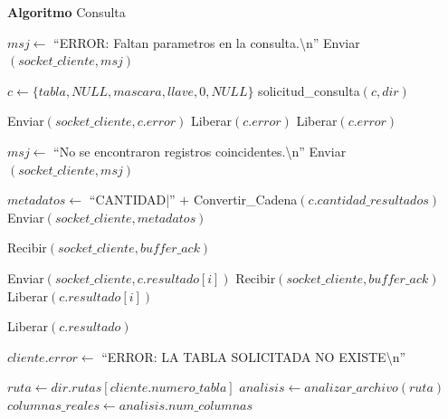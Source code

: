 \begin{tcolorbox}[colback=white, colframe=azul_unam, 
title=Pseudocódigo: consulta.c, breakable]

\textbf{Algoritmo} Consulta

\begin{algorithmic}[1]



    \State $msj \gets$ ``ERROR: Faltan parametros en la consulta.\textbackslash n''
    \State Enviar$(socket\_cliente, msj)$
    \State \Return
\EndIf

\State $c \gets \{tabla, NULL, mascara, llave, 0, NULL\}$
\State solicitud\_consulta$(c, dir)$

        \State Enviar$(socket\_cliente, c.error)$
        \State Liberar$(c.error)$
        \State \Return
    \EndIf
    \State Liberar$(c.error)$
\EndIf

    \State $msj \gets$ ``No se encontraron registros coincidentes.\textbackslash n''
    \State Enviar$(socket\_cliente, msj)$
    \State \Return
\EndIf

\State $metadatos \gets$ ``CANTIDAD|'' $+$ Convertir\_Cadena$(c.cantidad\_resultados)$
\State Enviar$(socket\_cliente, metadatos)$

\State Recibir$(socket\_cliente, buffer\_ack)$

    \State Enviar$(socket\_cliente, c.resultado[i])$
    \State Recibir$(socket\_cliente, buffer\_ack)$
    \State Liberar$(c.resultado[i])$
\EndFor

\State Liberar$(c.resultado)$

\EndProcedure

\vspace{0.3cm}



    \State $cliente.error \gets$ ``ERROR: LA TABLA SOLICITADA NO EXISTE\textbackslash n''
    \State \Return
\EndIf

\State $ruta \gets dir.rutas[cliente.numero\_tabla]$
\State $analisis \gets analizar\_archivo(ruta)$
\State $columnas\_reales \gets analisis.num\_columnas$


\end{algorithmic}
\end{tcolorbox}
